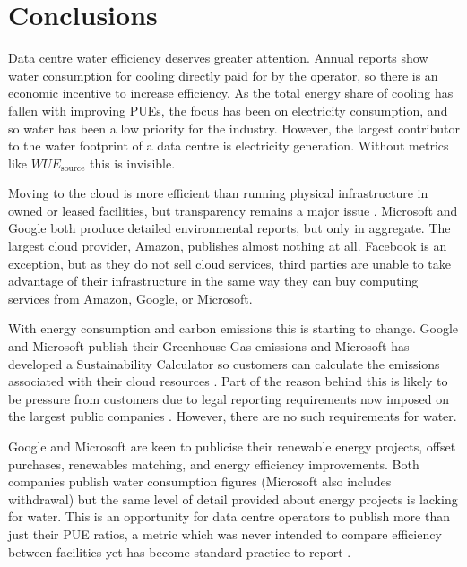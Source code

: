 \documentclass{article}
\begin{document}
\section*{Conclusions}

Data centre water efficiency deserves greater attention. Annual reports show
water consumption for cooling directly paid for by the operator, so there is an
economic incentive to increase efficiency. As the total energy share of cooling
has fallen with improving PUEs, the focus has been on electricity consumption,
and so water has been a low priority for the industry. However, the largest
contributor to the water footprint of a data centre is electricity generation.
Without metrics like $WUE_\textrm{source}$ this is invisible.

Moving to the cloud is more efficient than running physical infrastructure in
owned or leased facilities, but transparency remains a major issue
\cite{mytton_hiding_2020}. Microsoft and Google both produce detailed
environmental reports, but only in aggregate. The largest cloud provider,
Amazon, publishes almost nothing at all. Facebook is an exception, but as they
do not sell cloud services, third parties are unable to take advantage of their
infrastructure in the same way they can buy computing services from Amazon,
Google, or Microsoft.

With energy consumption and carbon emissions this is starting to change. Google
and Microsoft publish their Greenhouse Gas emissions and Microsoft has
developed a Sustainability Calculator so customers can calculate the emissions
associated with their cloud resources \cite{joppa_progress_2020}. Part of the
reason behind this is likely to be pressure from customers due to legal
reporting requirements now imposed on the largest public companies
\cite{european_commission_eu_2020,uk_government_streamlined_2018}. However,
there are no such requirements for water.

Google and Microsoft are keen to publicise their renewable energy projects,
offset purchases, renewables matching, and energy efficiency improvements. Both
companies publish water consumption figures (Microsoft also includes
withdrawal) but the same level of detail provided about energy projects is
lacking for water. This is an opportunity for data centre operators to publish
more than just their PUE ratios, a metric which was never intended to compare
efficiency between facilities \cite{van_de_voort_analysis_2017} yet has become
standard practice to report \cite{zoie_analysis_2017}.
\end{document}
